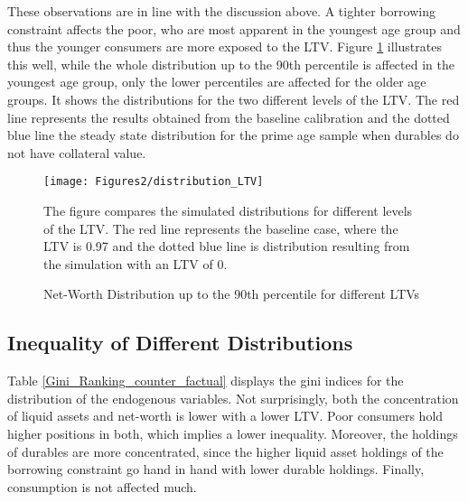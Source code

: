 \documentclass[a4paper,12pt,legno]{article}
\begin{document}
These observations are in line with the discussion above. A tighter borrowing constraint affects the poor, who are most apparent in the youngest age group and thus the younger consumers are more exposed to the LTV. Figure \ref{downpayment_vs_baseline} illustrates this well, while the whole distribution up to the 90th percentile is affected in the youngest age group, only the lower percentiles are affected for the older age groups. It shows the distributions for the two different levels of the LTV. The red line represents the results obtained from the baseline calibration and the dotted blue line the steady state distribution for the prime age sample when durables do not have collateral value. 

\begin{figure}[!htbp]
\caption{Net-Worth Distribution up to the 90th percentile for different LTVs} 
\label{downpayment_vs_baseline}	%
\centering
\texttt{[image: Figures2/distribution\_LTV]}  %

\begin{minipage}{0.8\linewidth}
\footnotesize{The figure compares the simulated distributions for different levels of the LTV. The red line represents the baseline case, where the LTV is 0.97 and the dotted blue line is distribution resulting from the simulation with an LTV of 0.}
\end{minipage}

\end{figure}

\subsection{Inequality of Different Distributions}
Table \ref{Gini_Ranking_counter_factual} displays the gini indices for the distribution of the endogenous variables. Not surprisingly, both the concentration of liquid assets and net-worth is lower with a lower LTV. Poor consumers hold higher positions in both, which implies a lower inequality. Moreover, the holdings of durables are more concentrated, since the higher liquid asset holdings of the borrowing constraint go hand in hand with lower durable holdings. Finally, consumption is not affected much.  
\end{document}
